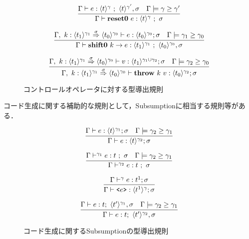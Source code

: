 \documentclass[dvipdfmx]{jsarticle}
\begin{document}
\begin{figure}[H]
  \centering
  \[
    \infer{\Gamma \vdash \resetz{e} : \codeT{t}{\gamma} ~;~ \sigma}
    {\Gamma \vdash e : \codeT{t}{\gamma} ~;~ \codeT{t}{\gamma'}, \sigma
      & \Gamma \models \gamma \ord \gamma'
    }
  \]

  \[
    \infer{\Gamma \vdash \shiftz{k}{e} : \codeT{t_1}{\gamma_1} ~;~ \codeT{t_0}{\gamma_0},\sigma}
    {\Gamma,~k:\contT{\codeT{t_1}{\gamma_1}}{\codeT{t_0}{\gamma_0}}{\sigma}
      \vdash e : \codeT{t_0}{\gamma_0} ; \sigma
      & \Gamma \models \gamma_1 \ord \gamma_0
    }
  \]

  \[
    \infer
    {\Gamma,~ k:\contT{\codeT{t_1}{\gamma_1}}{\codeT{t_0}{\gamma_0}}{\sigma}
      \vdash \throw{k}{v} : \codeT{t_0}{\gamma_2} ; \sigma}
    {\Gamma,~ k:\contT{\codeT{t_1}{\gamma_1}}{\codeT{t_0}{\gamma_0}}{\sigma}
      \vdash v : \codeT{t_1}{\gamma_1 \cup \gamma_2} ; \sigma
      & \Gamma \models \gamma_2 \ord \gamma_0
    }
  \]
  \caption{コントロールオペレータに対する型導出規則}
  \label{fig:controlop_type_rule}
\end{figure}


コード生成に関する補助的な規則として，Subsumptionに相当する規則等がある．


\begin{figure}[H]
  \centering
  \[
    \infer
    {\Gamma \vdash e : \codeT{t}{\gamma_2} ; \sigma}
    {\Gamma \vdash e : \codeT{t}{\gamma_1} ; \sigma
      & \Gamma \models \gamma_2 \ord \gamma_1
    }
  \]

  \[
    \infer
    {\Gamma \vdash^{\gamma_2} e : t ~;~ \sigma}
    {\Gamma \vdash^{\gamma_1} e : t ~;~ \sigma
      & \Gamma \models \gamma_2 \ord \gamma_1
    }
  \]


  \[
    \infer
    {\Gamma \vdash \code{e} : \codeT{t^1}{\gamma} ; \sigma}
    {\Gamma \vdash^{\gamma} e : t^1 ; \sigma}
  \]

  \[
    \infer
    {\Gamma \vdash e : t;~\codeT{t'}{\gamma_2},\sigma}
    {\Gamma \vdash e : t;~\codeT{t'}{\gamma_1},\sigma
      & \Gamma \models \gamma_2 \ord \gamma_1
    }
  \]

  \caption{コード生成に関するSubsumptionの型導出規則}
  \label{fig:code_gen_subs_type_rule}
\end{figure}
\end{document}
